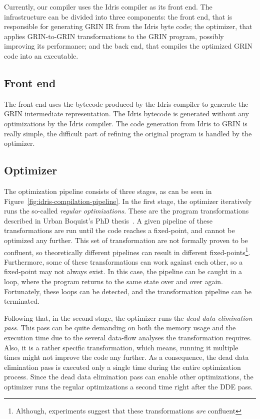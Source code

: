 \documentclass[main.tex]{subfiles}
\begin{document}
	
	Currently, our compiler uses the Idris compiler as its front end. The infrastructure can be divided into three components: the front end, that is responsible for generating GRIN IR from the Idris byte code; the optimizer, that applies GRIN-to-GRIN transformations to the GRIN program, possibly improving its performance; and the back end, that compiles the optimized GRIN code into an executable.
	
	\subsection{Front end}
	
	The front end uses the bytecode produced by the Idris compiler to generate the GRIN intermediate representation. The Idris bytecode is generated without any optimizations by the Idris compiler. The code generation from Idris to GRIN is really simple, the difficult part of refining the original program is handled by the optimizer. 
	
	\subsection{Optimizer}
	\label{subsec:optimizer}
	
	The optimization pipeline consists of three stages, as can be seen in Figure~\ref{fig:idris-compilation-pipeline}. In the first stage, the optimizer iteratively runs the so-called \textit{regular optimizations}. These are the program transformations described in Urban Boquist's PhD thesis~\cite{boquist-phd}. A given pipeline of these transformations are run until the code reaches a fixed-point, and cannot be optimized any further. This set of transformation are not formally proven to be confluent, so theoretically different pipelines can result in different fixed-points\footnote{Although, experiments suggest that these transformations \textit{are} confluent}. Furthermore, some of these transformations can work against each other, so a fixed-point may not always exist. In this case, the pipeline can be caught in a loop, where the program returns to the same state over and over again. Fortunately, these loops can be detected, and the transformation pipeline can be terminated. 
	
	\begin{figure}[t] 
		\centering
		
	\end{figure}
	
	Following that, in the second stage, the optimizer runs the \textit{dead data elimination pass}. This pass can be quite demanding on both the memory usage and the execution time due to the several data-flow analyses the transformation requires. Also, it is a rather specific transformation, which means, running it multiple times might not improve the code any further. As a consequence, the dead data elimination pass is executed only a single time during the entire optimization process. Since the dead data elimination pass can enable other optimizations, the optimizer runs the regular optimizations a second time right after the DDE pass.
	
\end{document}
